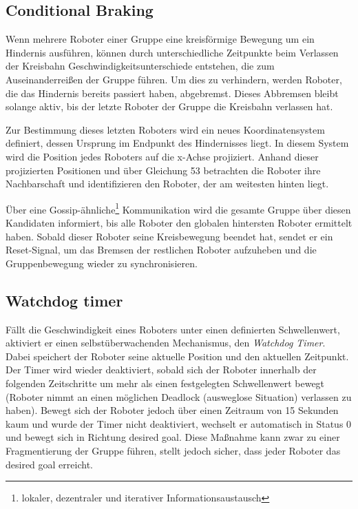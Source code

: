\documentclass[conference]{IEEEtran}
\begin{document}
\subsection*{Conditional Braking}

Wenn mehrere Roboter einer Gruppe eine kreisförmige Bewegung um ein Hindernis ausführen, können durch unterschiedliche Zeitpunkte beim Verlassen der Kreisbahn Geschwindigkeitsunterschiede entstehen, die zum Auseinanderreißen der Gruppe führen. Um dies zu verhindern, werden Roboter, die das Hindernis bereits passiert haben, abgebremst. Dieses Abbremsen bleibt solange aktiv, bis der letzte Roboter der Gruppe die Kreisbahn verlassen hat.

Zur Bestimmung dieses letzten Roboters wird ein neues Koordinatensystem definiert, dessen Ursprung im Endpunkt des Hindernisses liegt. In diesem System wird die Position jedes Roboters auf die x-Achse projiziert. Anhand dieser projizierten Positionen und über Gleichung 53 betrachten die Roboter ihre Nachbarschaft und identifizieren den Roboter, der am weitesten hinten liegt.

Über eine Gossip-ähnliche\footnote{lokaler, dezentraler und iterativer Informationsaustausch} Kommunikation wird die gesamte Gruppe über diesen Kandidaten informiert, bis alle Roboter den globalen hintersten Roboter ermittelt haben. Sobald dieser Roboter seine Kreisbewegung beendet hat, sendet er ein Reset-Signal, um das Bremsen der restlichen Roboter aufzuheben und die Gruppenbewegung wieder zu synchronisieren.

\subsection*{Watchdog timer}
Fällt die Geschwindigkeit eines Roboters unter einen definierten Schwellenwert, aktiviert er einen selbstüberwachenden Mechanismus, den \textit{Watchdog Timer}. Dabei speichert der Roboter seine aktuelle Position und den aktuellen Zeitpunkt. Der Timer wird wieder deaktiviert, sobald sich der Roboter innerhalb der folgenden Zeitschritte um mehr als einen festgelegten Schwellenwert bewegt (Roboter nimmt an einen möglichen Deadlock (ausweglose Situation) verlassen zu haben). Bewegt sich der Roboter jedoch über einen Zeitraum von 15 Sekunden kaum und wurde der Timer nicht deaktiviert, wechselt er automatisch in Status 0 und bewegt sich in Richtung desired goal. Diese Maßnahme kann zwar zu einer Fragmentierung der Gruppe führen, stellt jedoch sicher, dass jeder Roboter das desired goal erreicht.
\end{document}
